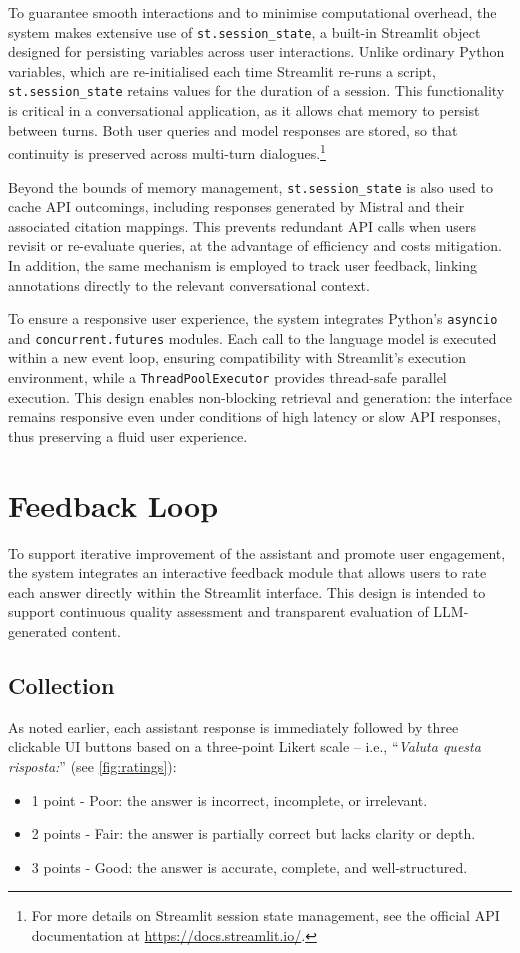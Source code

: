 \begin{spacing}{1.5}
To guarantee smooth interactions and to minimise computational overhead, the system makes extensive use of \texttt{st.session\_state}, a built-in Streamlit object designed for persisting variables across user interactions. Unlike ordinary Python variables, which are re-initialised each time Streamlit re-runs a script, \texttt{st.session\_state} retains values for the duration of a session. This functionality is critical in a conversational application, as it allows chat memory to persist between turns. Both user queries and model responses are stored, so that continuity is preserved across multi-turn dialogues.\footnote{For more details on Streamlit session state management, see the official API documentation at \url{https://docs.streamlit.io/}.\nocite{noauthor_streamlit_2025}} 

Beyond the bounds of memory management, \texttt{st.session\_state} is also used to cache API outcomings, including responses generated by Mistral and their associated citation mappings. This prevents redundant API calls when users revisit or re-evaluate queries, at the advantage of efficiency and costs mitigation. In addition, the same mechanism is employed to track user feedback, linking annotations directly to the relevant conversational context.

To ensure a responsive user experience, the system integrates Python's \texttt{asyncio} and \texttt{concurrent.futures} modules. Each call to the language model is executed within a new event loop, ensuring compatibility with Streamlit’s execution environment, while a \texttt{ThreadPoolExecutor} provides thread-safe parallel execution. This design enables non-blocking retrieval and generation: the interface remains responsive even under conditions of high latency or slow API responses, thus preserving a fluid user experience.


\section{Feedback Loop}
To support iterative improvement of the assistant and promote user engagement, the system integrates an interactive feedback module that allows users to rate each answer directly within the Streamlit interface. This design is intended to support continuous quality assessment and transparent evaluation of LLM-generated content.

\subsection{Collection}
As noted earlier, each assistant response is immediately followed by three clickable UI buttons based on a three-point Likert scale -- i.e., ``\textit{Valuta questa risposta:}'' (see \autoref{fig:ratings}):
\begin{itemize}
\item 1 point - Poor: the answer is incorrect, incomplete, or irrelevant.
\item 2 points - Fair: the answer is partially correct but lacks clarity or depth.
\item 3 points - Good: the answer is accurate, complete, and well-structured.
\end{itemize}


\end{spacing}
